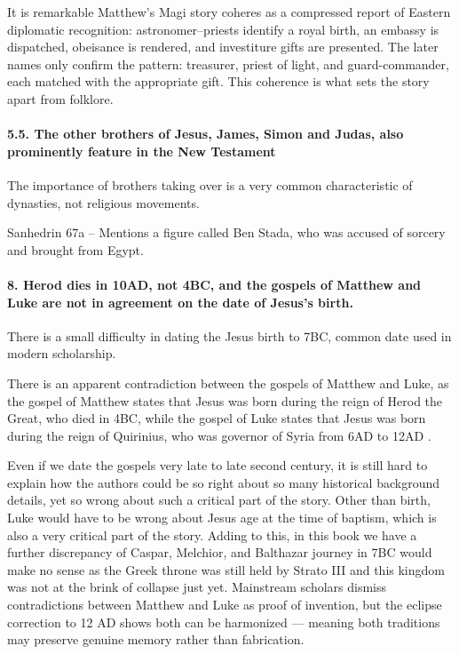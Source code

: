 It is remarkable Matthew’s Magi story coheres as a compressed report of Eastern diplomatic recognition: astronomer–priests identify a royal birth, an embassy is dispatched, obeisance is rendered, and investiture gifts are presented.
The later names only confirm the pattern: treasurer, priest of light, and guard-commander, each matched with the appropriate gift.
This coherence is what sets the story apart from folklore.

\paragraph{5.5.
The other brothers of Jesus, James, Simon and Judas, also prominently feature in the New Testament}\label{par:the-other-brothers-of-jesus-james-simon-and-judas-also-prominently-feature-in-the-new-testament}

The importance of brothers taking over is a very common characteristic of dynasties, not religious movements.

Sanhedrin 67a -- Mentions a figure called Ben Stada, who was accused of sorcery and brought from Egypt.


\paragraph{8.
Herod dies in 10AD, not 4BC, and the gospels of Matthew and Luke are not in agreement on the date of Jesus's birth.}\label{par:herod-dies-in-10ad-not-4bc-and-the-gospels-of-matthew-and-luke-are-not-in-agreement-on-the-date-of-jesuss-birth.}

There is a small difficulty in dating the Jesus birth to 7BC, common date used in modern scholarship.

There is an apparent contradiction between the gospels of Matthew and Luke, as the gospel of Matthew states that Jesus was born during the reign of Herod the Great, who died in 4BC, while the gospel of Luke states that Jesus was born during the reign of Quirinius, who was governor of Syria from 6AD to 12AD .

Even if we date the gospels very late to late second century, it is still hard to explain how the authors could be so right about so many historical background details, yet so wrong about such a critical part of the story.
Other than birth, Luke would have to be wrong about Jesus age at the time of baptism, which is also a very critical part of the story.
Adding to this, in this book we have a further discrepancy of Caspar, Melchior, and Balthazar journey in 7BC would make no sense as the Greek throne was still held by Strato III and this kingdom was not at the brink of collapse just yet.
Mainstream scholars dismiss contradictions between Matthew and Luke as proof of invention, but the eclipse correction to 12 AD shows both can be harmonized — meaning both traditions may preserve genuine memory rather than fabrication.


